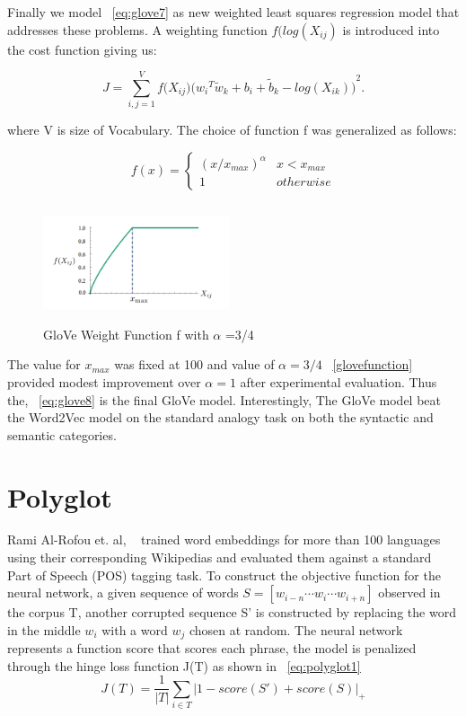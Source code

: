 Finally we model ~\autoref{eq:glove7} as new weighted least squares regression model that addresses these problems. A weighting function $f(log({X}_{ij})$ is introduced into the
cost function giving us:

\begin{equation} \label{eq:glove8}
 J =  \sum_{i,j=1}^{V}  f \big({X}_{ij}\big)  {\big({{w}_{i}}^{T} {\tilde{w}}_{k} +  {b}_{i} +  {\tilde{b}}_{k} - log({X}_{ik})\big)}^{2}.
\end{equation}

where V is size of Vocabulary. The choice of function f was generalized as follows:

\begin{equation} \label{eq:glove9}
f (x) =\begin{cases}{(x/{x}_{max})}^{\alpha} & x < {x}_{max}\\1 & otherwise\end{cases} 
\end{equation}

\begin{figure}[ht!]
	\centering
		\includegraphics[height=35mm,  width=55mm]{figures/4_weightfunction.png}
		\caption[Glove Weight Function]{GloVe Weight Function f with $\alpha$ =3/4}
			\label{glovefunction}
\end{figure}


The value for ${x}_{max}$ was fixed at 100 and value of $\alpha = 3/4$  ~\autoref{glovefunction} provided modest improvement over $\alpha = 1$ after experimental evaluation. Thus the, ~\autoref{eq:glove8}  is the final GloVe model. Interestingly, The GloVe model beat the Word2Vec model on the standard analogy task on both the syntactic and semantic categories. 
  
\section{Polyglot}

Rami Al-Rofou et. al, ~\parencite{polyglot:2013:ACL-CoNLL} trained word embeddings for more than 100 languages using their corresponding Wikipedias and evaluated them against a standard Part of Speech (POS) tagging task. To construct the objective function for the neural network, a given sequence of words $S  = [{w}_{i-n} \cdots {w}_{i}  \cdots {w}_{i+n}]$ observed in the corpus T,  another corrupted sequence S'  is constructed by replacing the word in the middle ${w}_{i}$ with a word ${w}_{j}$ chosen at random. The neural network represents a function score that scores each phrase, the model is penalized through the hinge loss function J(T) as shown in ~\autoref{eq:polyglot1} 
\begin{equation} \label{eq:polyglot1}
J(T) = \frac{1}{|T|}  \sum_{i  \in T} {|1 - score(S') + score(S)|}_{+} 
\end{equation}

